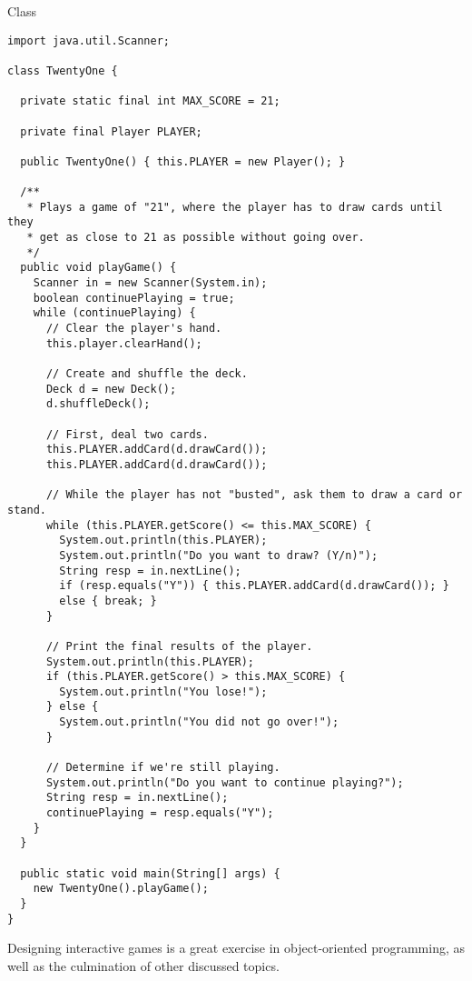 \begin{cl}{ Class}
\begin{lstlisting}[language=MyJava]
import java.util.Scanner;

class TwentyOne {

  private static final int MAX_SCORE = 21;

  private final Player PLAYER;

  public TwentyOne() { this.PLAYER = new Player(); }

  /**
   * Plays a game of "21", where the player has to draw cards until they
   * get as close to 21 as possible without going over.
   */
  public void playGame() {
    Scanner in = new Scanner(System.in);
    boolean continuePlaying = true;
    while (continuePlaying) {
      // Clear the player's hand.
      this.player.clearHand();

      // Create and shuffle the deck.
      Deck d = new Deck();
      d.shuffleDeck();

      // First, deal two cards.
      this.PLAYER.addCard(d.drawCard());
      this.PLAYER.addCard(d.drawCard());

      // While the player has not "busted", ask them to draw a card or stand.
      while (this.PLAYER.getScore() <= this.MAX_SCORE) {
        System.out.println(this.PLAYER);
        System.out.println("Do you want to draw? (Y/n)");
        String resp = in.nextLine();
        if (resp.equals("Y")) { this.PLAYER.addCard(d.drawCard()); }
        else { break; }
      }

      // Print the final results of the player.
      System.out.println(this.PLAYER);
      if (this.PLAYER.getScore() > this.MAX_SCORE) {
        System.out.println("You lose!");
      } else {
        System.out.println("You did not go over!");
      }

      // Determine if we're still playing.
      System.out.println("Do you want to continue playing?");
      String resp = in.nextLine();
      continuePlaying = resp.equals("Y");
    }
  }

  public static void main(String[] args) {
    new TwentyOne().playGame();
  }
}
\end{lstlisting}
\end{cl}

Designing interactive games is a great exercise in object-oriented programming, as well as the culmination of other discussed topics.


